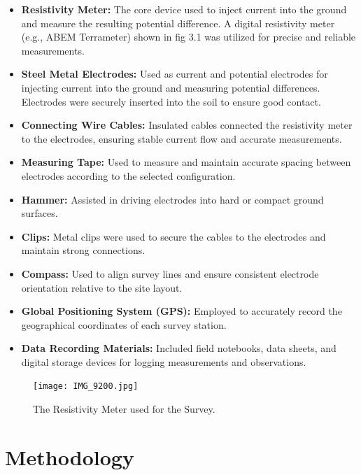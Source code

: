 \documentclass[12pt,a4paper]{report}
\begin{document}
\begin{itemize}
    \item \textbf{Resistivity Meter:} The core device used to inject current into the ground and measure the resulting potential difference. A digital resistivity meter (e.g., ABEM Terrameter) shown in fig 3.1 was utilized for precise and reliable measurements.    
    \item \textbf{Steel Metal Electrodes:} Used as current and potential electrodes for injecting current into the ground and measuring potential differences. Electrodes were securely inserted into the soil to ensure good contact.
    \item \textbf{Connecting Wire Cables:} Insulated cables connected the resistivity meter to the electrodes, ensuring stable current flow and accurate measurements.
    \item \textbf{Measuring Tape:} Used to measure and maintain accurate spacing between electrodes according to the selected configuration.
    \item \textbf{Hammer:} Assisted in driving electrodes into hard or compact ground surfaces.
    \item \textbf{Clips:} Metal clips were used to secure the cables to the electrodes and maintain strong connections.
    \item \textbf{Compass:} Used to align survey lines and ensure consistent electrode orientation relative to the site layout.
    \item \textbf{Global Positioning System (GPS):} Employed to accurately record the geographical coordinates of each survey station.
    \item \textbf{Data Recording Materials:} Included field notebooks, data sheets, and digital storage devices for logging measurements and observations.
\end{itemize}

\begin{figure}[H]
    \centering
    \texttt{[image: IMG\_9200.jpg]}
    \caption{The Resistivity Meter used for the Survey.}
\end{figure}

\section{Methodology}
\end{document}
